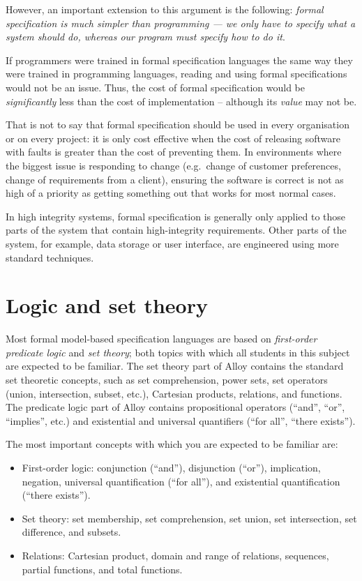 However, an important extension to this argument is the following: \emph{formal specification is much simpler than programming --- we only have to specify \emph{what} a system should do, whereas our program must specify \emph{how} to do it}.

If programmers were trained in formal specification languages the same way they were trained in programming languages, reading and using formal specifications would not be an issue. Thus, the cost of formal specification would be \emph{significantly} less than the cost of implementation -- although its \emph{value} may not be.

That is not to say that formal specification should be used in every organisation or on every project: it is only cost effective when the cost of releasing software with faults is greater than the cost of preventing them. In environments where the biggest issue is responding to change (e.g.\ change of customer preferences, change of requirements from a client), ensuring the software is correct is not as high of a priority as getting something out that works for most normal cases.

In high integrity systems, formal specification is generally only applied to those parts of the system that contain high-integrity requirements. Other parts of the system, for example, data storage or user interface, are engineered using more standard techniques.

\section{Logic and set theory}

Most formal model-based specification languages are based on \emph{first-order predicate logic} and \emph{set theory}; both topics with which all students in this subject are expected to be familiar. 
The set theory part of Alloy contains the standard set theoretic concepts, such as set comprehension, power sets, set operators (union, intersection, subset, etc.), Cartesian products, relations, and functions. The predicate logic part of Alloy contains propositional operators (``and'', ``or'', ``implies'', etc.) and existential and universal quantifiers (``for all'', ``there exists'').

The most important concepts with which you are expected to be familiar are:

\begin{itemize}

 \item First-order logic: conjunction (``and''), disjunction (``or''), implication, negation, universal quantification (``for all''), and existential quantification (``there exists'').

 \item Set theory: set membership, set comprehension, set union, set intersection, set difference, and subsets.

 \item Relations: Cartesian product, domain and range of relations, sequences, partial functions, and total functions.

\end{itemize}

